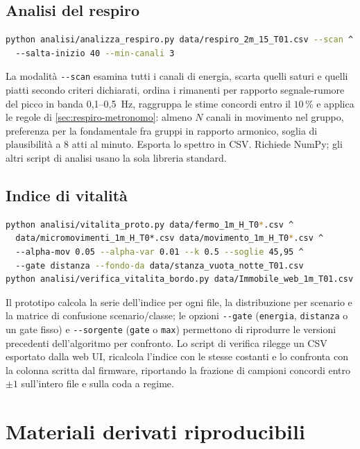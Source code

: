 \subsection{Analisi del respiro}

\begin{lstlisting}[language=bash,basicstyle=\ttfamily\scriptsize]
python analisi/analizza_respiro.py data/respiro_2m_15_T01.csv --scan ^
  --salta-inizio 40 --min-canali 3
\end{lstlisting}

La modalità \texttt{-{}-scan} esamina tutti i canali di energia, scarta quelli saturi
e quelli piatti secondo criteri dichiarati, ordina i rimanenti per rapporto
segnale-rumore del picco in banda 0,1--0,5~Hz, raggruppa le stime concordi entro il
$10\,\%$ e applica le regole di \cref{sec:respiro-metronomo}: almeno $N$ canali in
movimento nel gruppo, preferenza per la fondamentale fra gruppi in rapporto armonico,
soglia di plausibilità a 8 atti al minuto. Esporta lo spettro in CSV. Richiede NumPy;
gli altri script di analisi usano la sola libreria standard.

\subsection{Indice di vitalità}

\begin{lstlisting}[language=bash,basicstyle=\ttfamily\scriptsize]
python analisi/vitalita_proto.py data/fermo_1m_H_T0*.csv ^
  data/micromovimenti_1m_H_T0*.csv data/movimento_1m_H_T0*.csv ^
  --alpha-mov 0.05 --alpha-var 0.01 --k 0.5 --soglie 45,95 ^
  --gate distanza --fondo-da data/stanza_vuota_notte_T01.csv
python analisi/verifica_vitalita_bordo.py data/Immobile_web_1m_T01.csv
\end{lstlisting}

Il prototipo calcola la serie dell'indice per ogni file, la distribuzione per
scenario e la matrice di confusione scenario/classe; le opzioni \texttt{-{}-gate}
(\texttt{energia}, \texttt{distanza} o un gate fisso) e \texttt{-{}-sorgente}
(\texttt{gate} o \texttt{max}) permettono di riprodurre le versioni precedenti
dell'algoritmo per confronto. Lo script di verifica rilegge un CSV esportato dalla
web UI, ricalcola l'indice con le stesse costanti e lo confronta con la colonna
scritta dal firmware, riportando la frazione di campioni concordi entro $\pm 1$
sull'intero file e sulla coda a regime.

\section{Materiali derivati riproducibili}

